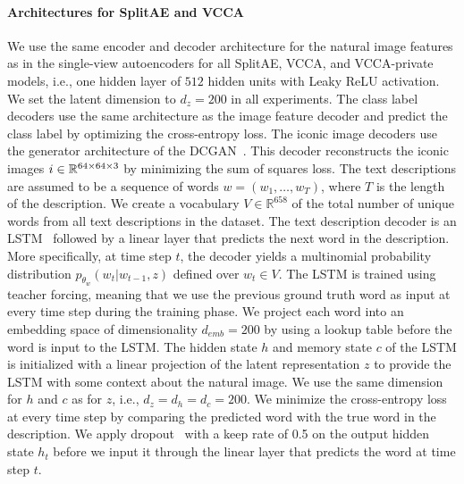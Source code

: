 \paragraph{Architectures for SplitAE and VCCA} We use the same encoder and decoder architecture for the natural image features as in the single-view autoencoders for all SplitAE, VCCA, and VCCA-private models, i.e., one hidden layer of $512$ hidden units with Leaky ReLU activation. We set the latent dimension to $d_{z} = 200$ in all experiments. The class label decoders use the same architecture as the image feature decoder and predict the class label by optimizing the cross-entropy loss. The iconic image decoders use the generator architecture of the DCGAN~. This decoder reconstructs the iconic images $i \in \mathbb{R}^{64 \times 64 \times 3}$ by minimizing the sum of squares loss. The text descriptions are assumed to be a sequence of words $w = (w_1, \dots, w_T)$, where $T$ is the length of the description. We create a vocabulary $V \in \mathbb{R}^{658}$ of the total number of unique words from all text descriptions in the dataset. The text description decoder is an LSTM~ followed by a linear layer that predicts the next word in the description. More specifically, at time step $t$, the decoder yields a multinomial probability distribution $p_{{\theta_{w}}}(w_t | w_{t-1}, z)$ defined over $w_t \in V$. The LSTM is trained using teacher forcing, meaning that we use the previous ground truth word as input at every time step during the training phase. We project each word into an embedding space of dimensionality $d_{emb} = 200$ by using a lookup table before the word is input to the LSTM. The hidden state $h$ and memory state $c$ of the LSTM is initialized with a linear projection of the latent representation $z$ to provide the LSTM with some context about the natural image. We use the same dimension for $h$ and $c$ as for $z$, i.e., $d_{z} = d_{h} = d_{c} = 200$. We minimize the cross-entropy loss at every time step by comparing the predicted word with the true word in the description. We apply dropout~ with a keep rate of 0.5 on the output hidden state $h_t$ before we input it through the linear layer that predicts the word at time step $t$. 

